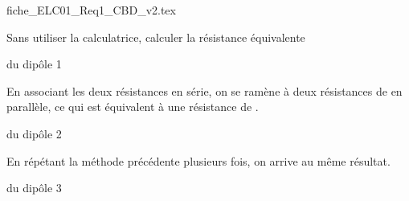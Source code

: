 \begin{center}
{fiche_ELC01_Req1_CBD_v2.tex}
\end{center}

Sans utiliser la calculatrice, calculer la résistance équivalente

\debutEntrainement



\begin{enonce}
du dipôle 1
\end{enonce}


\begin{corrige}
	En associant les deux résistances en série, on se ramène à deux résistances de  en parallèle, ce qui est équivalent à une résistance de .
\end{corrige}




\begin{enonce}
du dipôle 2
\end{enonce}


\begin{corrige}
	En répétant la méthode précédente plusieurs fois, on arrive au même résultat.
\end{corrige}




\begin{enonce}
du dipôle 3
\end{enonce}



